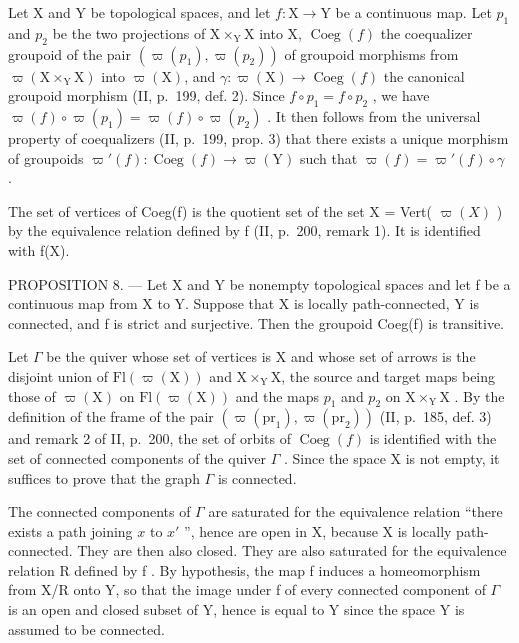 Let X and Y be topological spaces, and let \(f\colon\mathrm{X}\to\mathrm{Y}\) be a continuous map. Let \(p_{1}\) and \(p_{2}\) be the two projections of \(\mathrm{X}\times_{\mathrm{Y}}\mathrm{X}\) into X, \(\operatorname{Coeg}(f)\) the coequalizer groupoid of the pair \((\varpi(p_{1}),\varpi(p_{2}))\) of groupoid morphisms from \(\varpi(\mathrm{X}\times_{\mathrm{Y}}\mathrm{X})\) into \(\varpi(\mathrm{X})\), and \(\gamma\colon\varpi(\mathrm{X})\to\operatorname{Coeg}(f)\) the canonical groupoid morphism (II, p.~199, def. 2). Since \(f\circ p_{1}=f\circ p_{2}\) , we have \(\varpi(f)\circ\varpi(p_{1})=\varpi(f)\circ\varpi(p_{2})\) . It then follows from the universal property of coequalizers (II, p.~199, prop. 3) that there exists a unique morphism of groupoids \(\varpi'(f)\colon\operatorname{Coeg}(f)\to\varpi(\mathrm{Y})\) such that \(\varpi(f)=\varpi'(f)\circ\gamma\) .

The set of vertices of Coeg(f) is the quotient set of the set X = Vert( \(\varpi(X)\) ) by the equivalence relation defined by f (II, p.~200, remark 1). It is identified with f(X).

PROPOSITION 8. --- Let X and Y be nonempty topological spaces and let f be a continuous map from X to Y. Suppose that X is locally path-connected, Y is connected, and f is strict and surjective. Then the groupoid Coeg(f) is transitive.

Let \(\Gamma\) be the quiver whose set of vertices is X and whose set of arrows is the disjoint union of \(\mathrm{Fl}(\varpi(\mathrm{X}))\) and \(\mathrm{X}\times_{\mathrm{Y}}\mathrm{X}\), the source and target maps being those of \(\varpi(\mathrm{X})\) on \(\mathrm{Fl}(\varpi(\mathrm{X}))\) and the maps \(p_1\) and \(p_2\) on \(\mathrm{X}\times_{\mathrm{Y}}\mathrm{X}\) . By the definition of the frame of the pair \((\varpi(\mathrm{pr}_1), \varpi(\mathrm{pr}_2))\) (II, p.~185, def. 3) and remark 2 of II, p.~200, the set of orbits of \(\operatorname{Coeg}(f)\) is identified with the set of connected components of the quiver \(\Gamma\) . Since the space X is not empty, it suffices to prove that the graph \(\Gamma\) is connected.

The connected components of \(\Gamma\) are saturated for the equivalence relation “there exists a path joining \(x\) to \(x'\) ”, hence are open in X, because X is locally path-connected. They are then also closed. They are also saturated for the equivalence relation R defined by f . By hypothesis, the map f induces a homeomorphism from X/R onto Y, so that the image under f of every connected component of \(\Gamma\) is an open and closed subset of Y, hence is equal to Y since the space Y is assumed to be connected.

